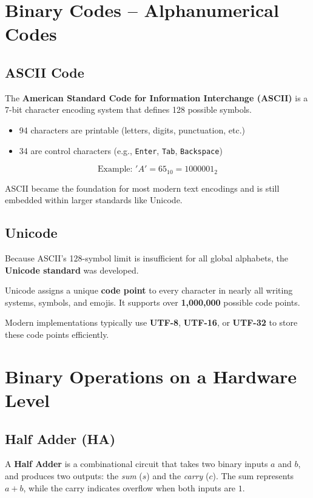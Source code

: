 \documentclass{article}
\begin{document}
\section{Binary Codes – Alphanumerical Codes}

\subsection{ASCII Code}
The \textbf{American Standard Code for Information Interchange (ASCII)} is a 7-bit character encoding system that defines 128 possible symbols.

\begin{itemize}
  \item 94 characters are printable (letters, digits, punctuation, etc.)
  \item 34 are control characters (e.g., \texttt{Enter}, \texttt{Tab}, \texttt{Backspace})
\end{itemize}

\[
\text{Example: } 'A' = 65_{10} = 1000001_2
\]

ASCII became the foundation for most modern text encodings and is still embedded within larger standards like Unicode.

\subsection{Unicode}
Because ASCII’s 128-symbol limit is insufficient for all global alphabets, the \textbf{Unicode standard} was developed.

Unicode assigns a unique \textbf{code point} to every character in nearly all writing systems, symbols, and emojis.  
It supports over \textbf{1,000,000} possible code points.

Modern implementations typically use \textbf{UTF-8}, \textbf{UTF-16}, or \textbf{UTF-32} to store these code points efficiently.

\section{Binary Operations on a Hardware Level}

\subsection{Half Adder (HA)}
A \textbf{Half Adder} is a combinational circuit that takes two binary inputs $a$ and $b$, and produces two outputs: the \textit{sum} ($s$) and the \textit{carry} ($c$). The sum represents $a + b$, while the carry indicates overflow when both inputs are $1$.
\end{document}
